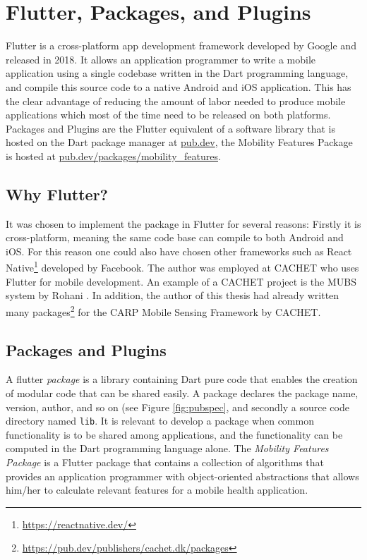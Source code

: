 \section{Flutter, Packages, and Plugins}
Flutter is a cross-platform app development framework developed by Google and released in 2018. It allows an application programmer to write a mobile application using a single codebase written in the Dart programming language, and compile this source code to a native Android and iOS application. This has the clear advantage of reducing the amount of labor needed to produce mobile applications which most of the time need to be released on both platforms. Packages and Plugins are the Flutter equivalent of a software library that is hosted on the Dart package manager at \url{pub.dev}, the Mobility Features Package is hosted at \url{pub.dev/packages/mobility_features}. 

\subsection{Why Flutter?}
It was chosen to implement the package in Flutter for several reasons: Firstly it is cross-platform, meaning the same code base can compile to both Android and iOS. For this reason one could also have chosen other frameworks such as React Native\footnote{\url{https://reactnative.dev/}} developed by Facebook. The author was employed at CACHET who uses Flutter for mobile development. An example of a CACHET project is the MUBS system by Rohani \cite{mubs-rohani}. In addition, the author of this thesis had already written many packages\footnote{\url{https://pub.dev/publishers/cachet.dk/packages}} for the CARP Mobile Sensing Framework by CACHET.

\subsection{Packages and Plugins}
A flutter \textit{package} is a library containing Dart pure code that enables the creation of modular code that can be shared easily. A package declares the package name, version, author, and so on (see Figure \ref{fig:pubspec}, and secondly a source code directory named \verb|lib|. It is relevant to develop a package when common functionality is to be shared among applications, and the functionality can be computed in the Dart programming language alone. The \textit{Mobility Features Package} is a Flutter package that contains a collection of algorithms that provides an application programmer with object-oriented abstractions that allows him/her to calculate relevant features for a mobile health application. 

